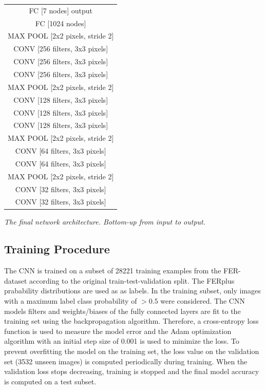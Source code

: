 \documentclass[twoside]{article}
\begin{document}
\begin{multicols}{2}
\begin{tabular}{|| c ||}
  \hline
  FC [7 nodes] output\\
  FC [1024 nodes]\\
  \hline
  MAX POOL [2x2 pixels, stride 2]\\
  CONV [256 filters, 3x3 pixels]\\
  CONV [256 filters, 3x3 pixels]\\
  CONV [256 filters, 3x3 pixels]\\
  \hline
  MAX POOL [2x2 pixels, stride 2]\\
  CONV [128 filters, 3x3 pixels]\\
  CONV [128 filters, 3x3 pixels]\\
  CONV [128 filters, 3x3 pixels]\\
  \hline
  MAX POOL [2x2 pixels, stride 2]\\
  CONV [64 filters, 3x3 pixels]\\
  CONV [64 filters, 3x3 pixels]\\
  \hline
  MAX POOL [2x2 pixels, stride 2]\\
  CONV [32 filters, 3x3 pixels]\\
  CONV [32 filters, 3x3 pixels]\\
  \hline
    
\end{tabular}

\medskip

\textit{The final network architecture. Bottom-up from input to output.}


\subsection{Training Procedure}
The CNN is trained on a subset of 28221 training examples from the FER-dataset according to the original train-test-validation split. The FERplus prabability distributions are used as as labels. In the training subset, only images with a maximum label class probability of $> 0.5$ were considered. The CNN models filters and weights/biases of the fully connected layers are fit to the training set using the backpropagation algorithm. Therefore, a cross-entropy loss function is used to measure the model error and the Adam optimization algorithm with an initial step size of 0.001 is used to minimize the loss. To prevent overfitting the model on the training set, the loss value on the validation set (3532 unseen images) is computed periodically during training. When the validation loss stops decreasing, training is stopped and the final model accuracy is computed on a test subset.



\end{multicols}
\end{document}
